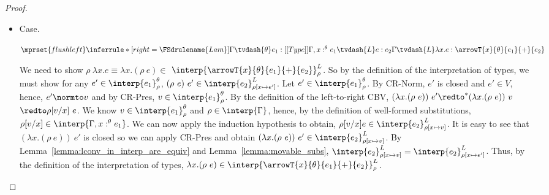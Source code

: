 \begin{proof}
\begin{itemize}
  \item[]Case.\ \\
    \begin{center}
      \begin{math}
        $$\mprset{flushleft}
        \inferrule* [right=\FSdrulename{Lam}] {
          \Gamma \tvdash{\theta} e_1:[[Type]]
          \\\\
          \Gamma,x:^\theta e_1 \tvdash{L} e:e_2
        }{\Gamma \tvdash{L} \lambda x.e:\arrowT{x}{\theta}{e_1}{+}{e_2}}
      \end{math}
    \end{center}
    We need to show 
    $\rho\ \lambda x.e \equiv \lambda x.(\rho\ e) \in $
    $\interp{\arrowT{x}{\theta}{e_1}{+}{e_2}}^{L}_\rho$.  So by the
    definition of the interpretation of types, we must show for any
    $e' \in \interp{e_1}^\theta_\rho$, $(\rho\ e)\ e' \in
    \interp{e_2}^{L}_{\rho[x \mapsto e']}$.  Let $e' \in \interp{e_1}^\theta_\rho$. 
    By CR-Norm, $e'$ is closed and $e' \in V$, hence, $e' \normto v$ and
    by CR-Pres, $v \in \interp{e_1}^\theta_{\rho}$.  By the definition of the
    left-to-right CBV, $(\lambda x.(\rho\ e))\ e' \redto^* (\lambda x.(\rho\ e))\ v $
    $\redto \rho[v/x]\ e$.  We
    know $v \in \interp{e_1}^\theta_\rho$ and $\rho \in
    \interp{\Gamma}$, hence, by the definition of well-formed
    substitutions, $\rho[v/x] \in \interp{\Gamma,x:^\theta e_1}$.  We can now apply the
    induction hypothesis to obtain, $\rho[v/x]e \in
    \interp{e_2}^L_{\rho[x \mapsto v]}$. It is easy to see that $(\lambda
    x.(\rho\ e))\ e'$ is closed so we can apply CR-Pres and
    obtain $(\lambda x.(\rho\ e))\ e' \in
    \interp{e_2}^L_{\rho[x \mapsto v]}$.  By 
    Lemma~\ref{lemma:lconv_in_interp_are_equiv} and Lemma~\ref{lemma:movable_subs},
    $\interp{e_2}^L_{\rho[x \mapsto v]} = \interp{e_2}^L_{\rho[x \mapsto e']}$.
    Thus, by the definition of the
    interpretation of types, $\lambda x.(\rho\ e) \in
    \interp{\arrowT{x}{\theta}{e_1}{+}{e_2}}^{L}_\rho$.


\end{itemize}
\end{proof}
